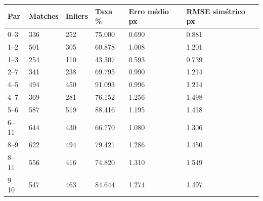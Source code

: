 \begin{tabular}{llllll}
\hline
Par & Matches & Inliers & Taxa \% & Erro médio px & RMSE simétrico px \\ \hline
0--3 & 336 & 252 & 75.000 & 0.690 & 0.881 \\
1--2 & 501 & 305 & 60.878 & 1.008 & 1.201 \\
1--3 & 254 & 110 & 43.307 & 0.593 & 0.739 \\
2--7 & 341 & 238 & 69.795 & 0.990 & 1.214 \\
4--5 & 494 & 450 & 91.093 & 0.996 & 1.214 \\
4--7 & 369 & 281 & 76.152 & 1.256 & 1.498 \\
5--6 & 587 & 519 & 88.416 & 1.195 & 1.418 \\
6--11 & 644 & 430 & 66.770 & 1.080 & 1.306 \\
8--9 & 622 & 494 & 79.421 & 1.286 & 1.450 \\
8--11 & 556 & 416 & 74.820 & 1.310 & 1.549 \\
9--10 & 547 & 463 & 84.644 & 1.274 & 1.497 \\
\hline
\end{tabular}
